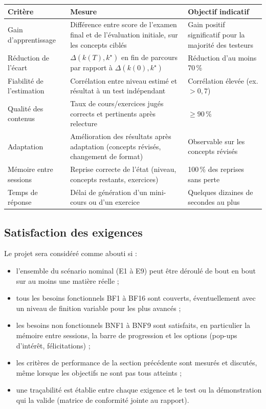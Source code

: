 \documentclass[11pt,a4paper]{article}
\begin{document}
\begin{center}
\renewcommand{\arraystretch}{1.25}
\begin{tabularx}{\textwidth}{@{}l X X@{}}
\toprule
\textbf{Critère} & \textbf{Mesure} & \textbf{Objectif indicatif}\\
\midrule
Gain d'apprentissage & Différence entre score de l'examen final et de l'évaluation initiale, sur les concepts ciblés & Gain positif significatif pour la majorité des testeurs\\
Réduction de l'écart & $\Delta(k(T),k^\star)$ en fin de parcours par rapport à $\Delta(k(0),k^\star)$ & Réduction d'au moins 70\,\%\\
Fiabilité de l'estimation & Corrélation entre niveau estimé et résultat à un test indépendant & Corrélation élevée (ex. $>0{,}7$)\\
Qualité des contenus & Taux de cours/exercices jugés corrects et pertinents après relecture & $\ge 90\,\%$\\
Adaptation & Amélioration des résultats après adaptation (concepts révisés, changement de format) & Observable sur les concepts révisés\\
Mémoire entre sessions & Reprise correcte de l'état (niveau, concepts restants, exercices) & 100\,\% des reprises sans perte\\
Temps de réponse & Délai de génération d'un mini-cours ou d'un exercice & Quelques dizaines de secondes au plus\\
\bottomrule
\end{tabularx}
\end{center}


\subsection{Satisfaction des exigences}

Le projet sera considéré comme abouti si :
\begin{itemize}[noitemsep]
  \item l'ensemble du scénario nominal (E1 à E9) peut être déroulé de bout en bout sur au moins une matière réelle ;
  \item tous les besoins fonctionnels BF1 à BF16 sont couverts, éventuellement avec un niveau de finition variable pour les plus avancés ;
  \item les besoins non fonctionnels BNF1 à BNF9 sont satisfaits, en particulier la mémoire entre sessions, la barre de progression et les options (pop-ups d'intérêt, félicitations) ;
  \item les critères de performance de la section précédente sont mesurés et discutés, même lorsque les objectifs ne sont pas tous atteints ;
  \item une traçabilité est établie entre chaque exigence et le test ou la démonstration qui la valide (matrice de conformité jointe au rapport).
\end{itemize}
\end{document}
